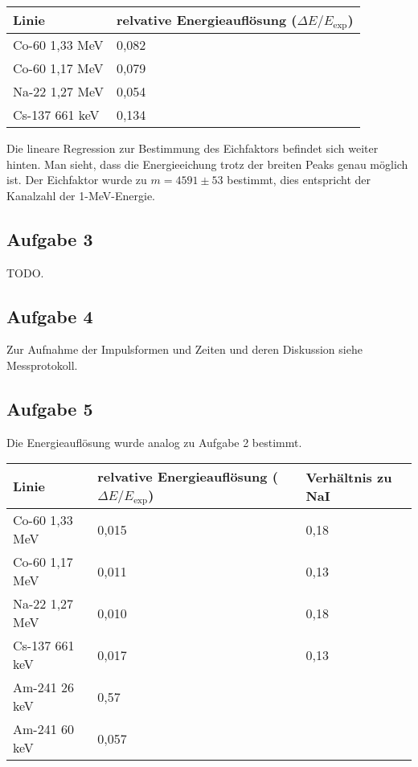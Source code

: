\documentclass[a4paper,german,12pt,smallheadings]{scrartcl}
\begin{document}
\begin{tabular}{l|l}
  Linie & relvative Energieauflösung ($\Delta E/E_\text{exp}$) \\
  \hline
  Co-60 1{,}33 MeV & 0{,}082 \\
  Co-60 1{,}17 MeV & 0{,}079 \\
  Na-22 1{,}27 MeV & 0{,}054 \\
  Cs-137 661 keV & 0{,}134 \\
\end{tabular}
\vspace{22pt}

Die lineare Regression zur Bestimmung des Eichfaktors befindet sich weiter
hinten. Man sieht, dass die Energieeichung trotz der breiten Peaks genau
möglich ist. Der Eichfaktor wurde zu $m = 4591\pm53$ bestimmt, dies entspricht
der Kanalzahl der 1-MeV-Energie.

\subsection{Aufgabe 3}

TODO.

\subsection{Aufgabe 4}

Zur Aufnahme der Impulsformen und Zeiten und deren Diskussion siehe Messprotokoll.

\subsection{Aufgabe 5}

Die Energieauflösung wurde analog zu Aufgabe 2 bestimmt.

\begin{tabular}{l|l|l}
  Linie & relvative Energieauflösung ($\Delta E/E_\text{exp}$) & Verhältnis zu NaI \\
  \hline
  Co-60 1{,}33 MeV & 0{,}015 & 0{,}18\\
  Co-60 1{,}17 MeV & 0{,}011 & 0{,}13\\
  Na-22 1{,}27 MeV & 0{,}010 & 0{,}18\\
  Cs-137 661 keV & 0{,}017 & 0{,}13\\
  Am-241 26 keV & 0{,}57 \\
  Am-241 60 keV & 0{,}057
\end{tabular}
\vspace{22pt}
\end{document}
